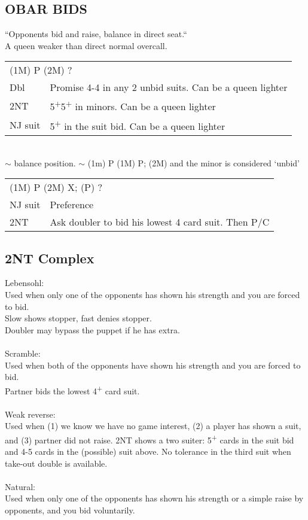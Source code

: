 \documentclass{article}
\newcommand{\nt}{\relsize{-1}NT\relsize{1}}
\newcommand{\up}{\textsuperscript{+}}
\begin{document}
\subsection{OBAR BIDS}

``Opponents bid and raise, balance in direct seat.``\\
A queen weaker than direct normal overcall.\\

\begin{tabular}{|l|p{6.5cm}}
	\multicolumn{2}{l}{(1M) P (2M) ?} \\
    Dbl & Promise 4-4 in any 2 unbid suits. Can be a queen lighter \\
    2\nt & 5\up{}5\up{} in minors. Can be a queen lighter \\
    NJ suit & 5\up{} in the suit bid. Can be a queen lighter \\
\end{tabular}\\
$\sim$ balance position. $\sim$ (1m) P (1M) P; (2M) and the minor is considered `unbid' \\

\begin{tabular}{|l|p{6.5cm}}
	\multicolumn{2}{l}{(1M) P (2M) X; (P) ?} \\
    NJ suit & Preference \\
    2\nt & Ask doubler to bid his lowest 4 card suit. Then P/C \\
\end{tabular}

\subsection{2\nt{} Complex}
	Lebensohl: \\
	Used when only one of the opponents has shown his strength and you are forced to bid. \\
	Slow shows stopper, fast denies stopper. \\
	Doubler may bypass the puppet if he has extra. \\\\
	Scramble: \\
	Used when both of the opponents have shown his strength and you are forced to bid. \\
	Partner bids the lowest 4\up{} card suit. \\\\
	Weak reverse:\\
	Used when (1) we know we have no game interest, (2) a player has shown a suit, and (3) partner did not raise. 2\nt{} shows a two suiter: 5\up{} cards in the suit bid and 4-5 cards in the (possible) suit above. No tolerance in the third suit when take-out double is available.\\\\
	Natural: \\
	Used when only one of the opponents has shown his strength or a simple raise by opponents, and you bid voluntarily. 
\end{document}
